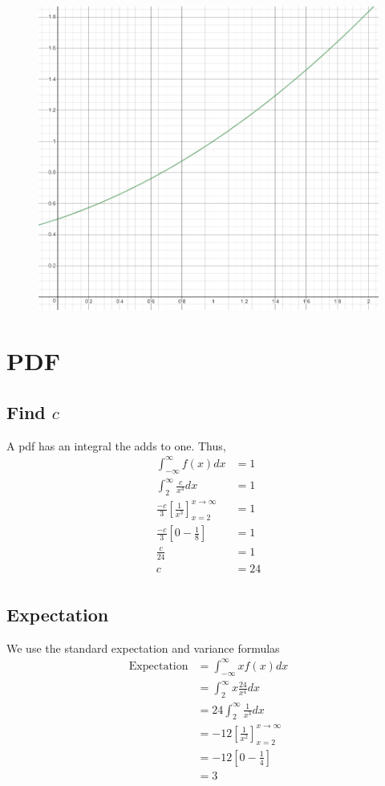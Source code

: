 \documentclass{article}
\begin{document}
\begin{figure}[H]
    \centering
    \includegraphics[width=5in]{pgf.png}
\end{figure}

\section{PDF}
\subsection{Find $c$}
A pdf has an integral the adds to one. Thus,
\begin{align*}
    \int_{-\infty}^\infty f(x) dx &= 1 \\
    \int_{2}^\infty \frac{c}{x^4} dx &= 1 \\
    \frac{-c}{3} \left[ \frac{1}{x^3} \right]_{x=2}^{x\to\infty} &= 1 \\
    \frac{-c}{3} \left[ 0 - \frac{1}{8} \right] &= 1 \\
    \frac{c}{24} &= 1 \\
    c &= 24 \\
\end{align*}

\subsection{Expectation}
We use the standard expectation and variance formulas
\begin{align*}
    \text{Expectation} &= \int_{-\infty}^{\infty} x f(x) dx \\
    &= \int_{2}^{\infty} x \frac{24}{x^4} dx \\
    &= 24 \int_{2}^{\infty} \frac{1}{x^3} dx \\
    &= -12 \left[ \frac{1}{x^2} \right]_{x=2}^{x\to\infty} \\
    &= -12 \left[ 0 - \frac{1}{4} \right] \\
    &= 3 \\
\end{align*}
\end{document}
